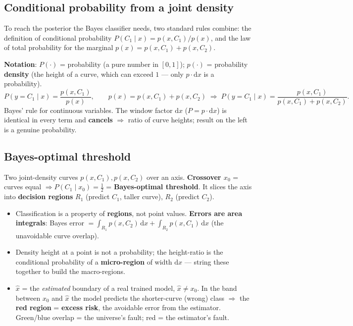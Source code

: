 \documentclass[11pt, a4paper]{article}
\newcommand{\kw}[1]{\textbf{#1}}
\begin{document}
\subsection{Conditional probability from a joint density}

To reach the posterior the Bayes classifier needs, two standard rules combine: the definition of
conditional probability $P(C_1\mid x)=p(x,C_1)/p(x)$, and the law of total probability for the
marginal $p(x)=p(x,C_1)+p(x,C_2)$.

\kw{Notation}: $P(\cdot)$ = probability (a pure number in $[0,1]$); $p(\cdot)$ = probability
\kw{density} (the height of a curve, which can exceed $1$ — only $p\cdot\mathrm dx$ is a probability).
\[
P(y{=}C_1\mid x)=\frac{p(x,C_1)}{p(x)},\qquad p(x)=p(x,C_1)+p(x,C_2)
\;\Rightarrow\;
P(y{=}C_1\mid x)=\frac{p(x,C_1)}{p(x,C_1)+p(x,C_2)}.
\]
Bayes' rule for continuous variables. The window factor $\mathrm dx$ ($P=p\cdot\mathrm dx$) is
identical in every term and \kw{cancels} $\Rightarrow$ ratio of curve heights; result on the left is
a genuine probability.

\subsection{Bayes-optimal threshold}

\begin{setupbox}
Two joint-density curves $p(x,C_1),p(x,C_2)$ over an axis. \kw{Crossover $x_0$} = curves equal
$\Rightarrow P(C_1\mid x_0)=\tfrac12$ = \kw{Bayes-optimal threshold}. It slices the axis into
\kw{decision regions} $R_1$ (predict $C_1$, taller curve), $R_2$ (predict $C_2$).
\end{setupbox}

\begin{itemize}
  \item Classification is a property of \kw{regions}, not point values. \kw{Errors are area
  integrals}: Bayes error $=\int_{R_1}p(x,C_2)\,\mathrm dx+\int_{R_2}p(x,C_1)\,\mathrm dx$ (the
  unavoidable curve overlap).
  \item Density height at a point is not a probability; the height-ratio is the conditional
  probability of a \kw{micro-region} of width $\mathrm dx$ — string these together to build the
  macro-regions.
  \item \kw{$\hat x$} = the \emph{estimated} boundary of a real trained model, $\hat x\ne x_0$. In the
  band between $x_0$ and $\hat x$ the model predicts the shorter-curve (wrong) class $\Rightarrow$ the
  \kw{red region} = \kw{excess risk}, the avoidable error from the estimator. Green/blue overlap =
  the universe's fault; red = the estimator's fault.
\end{itemize}
\end{document}
